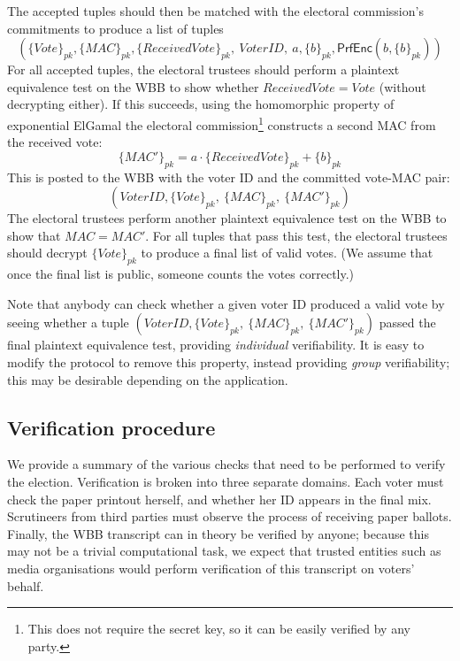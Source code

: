\documentclass[12pt,a4paper]{article}
\newcommand{\PrfEnc}{\mathsf{PrfEnc}}
\theoremstyle{definition}
\newcommand{\Vote}{\mathit{Vote}}
\newcommand{\VoterID}{\mathit{VoterID}}
\newcommand{\Mac}{\mathit{MAC}}
\newcounter{protocol}
\begin{document}
The accepted tuples should then be matched with the electoral commission's commitments to produce a list of tuples
$$\left(\{\Vote\}_{pk},\{\Mac\}_{pk}, \{ReceivedVote\}_{pk},\ \VoterID,\ a, \{b\}_{pk}, \PrfEnc(b, \{b\}_{pk})\right)$$
For all accepted tuples, the electoral trustees should perform a plaintext equivalence test on the WBB to show whether $ReceivedVote=\Vote$ (without decrypting either). If this succeeds, using the homomorphic property of exponential ElGamal the electoral commission\footnote{This does not require the secret key, so it can be easily verified by any party.} constructs a second MAC from the received vote:
$$\{\Mac'\}_{pk}=a\cdot\{ReceivedVote\}_{pk}+\{b\}_{pk}$$
This is posted to the WBB with the voter ID and the committed vote-MAC pair:
$$\left(\VoterID, \{\Vote\}_{pk},\ \{\Mac\}_{pk},\ \{\Mac'\}_{pk}\right)$$
The electoral trustees perform another plaintext equivalence test on the WBB to show that $\Mac=\Mac'$. For all tuples that pass this test, the electoral trustees should decrypt $\{\Vote\}_{pk}$ to produce a final list of valid votes. (We assume that once the final list is public, someone counts the votes correctly.)

Note that anybody can check whether a given voter ID produced a valid vote by seeing whether a tuple $\left(\VoterID, \{\Vote\}_{pk},\ \{\Mac\}_{pk},\ \{\Mac'\}_{pk}\right)$ passed the final plaintext equivalence test, providing \textit{individual} verifiability. It is easy to modify the protocol to remove this property, instead providing \textit{group} verifiability; this may be desirable depending on the application.
\subsection{Verification procedure}
We provide a summary of the various checks that need to be performed to verify the election. Verification is broken into three separate domains. Each voter must check the paper printout herself, and whether her ID appears in the final mix. Scrutineers from third parties must observe the process of receiving paper ballots. Finally, the WBB transcript can in theory be verified by anyone; because this may not be a trivial computational task, we expect that trusted entities such as media organisations would perform verification of this transcript on voters' behalf.
\end{document}
